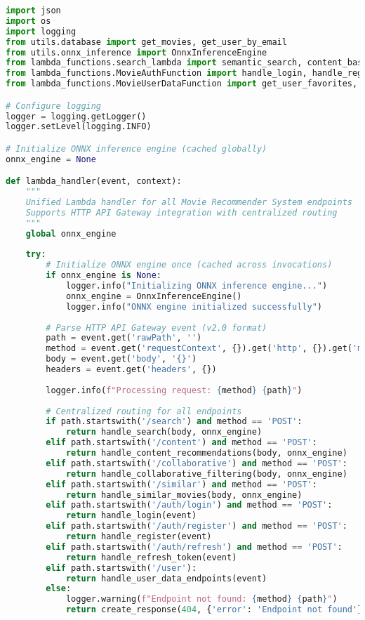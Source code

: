 \documentclass[11pt,a4paper]{article}
\begin{document}
\begin{lstlisting}[language=Python, caption=Lambda Handler - Router Centralizzato]
import json
import os
import logging
from utils.database import get_movies, get_user_by_email
from utils.onnx_inference import OnnxInferenceEngine
from lambda_functions.search_lambda import semantic_search, content_based_recommendations
from lambda_functions.MovieAuthFunction import handle_login, handle_register, handle_refresh_token
from lambda_functions.MovieUserDataFunction import get_user_favorites, add_to_favorites

# Configure logging
logger = logging.getLogger()
logger.setLevel(logging.INFO)

# Initialize ONNX inference engine (cached globally)
onnx_engine = None

def lambda_handler(event, context):
    """
    Unified Lambda handler for all Movie Recommender System endpoints
    Supports HTTP API Gateway integration with centralized routing
    """
    global onnx_engine
    
    try:
        # Initialize ONNX engine once (cached across invocations)
        if onnx_engine is None:
            logger.info("Initializing ONNX inference engine...")
            onnx_engine = OnnxInferenceEngine()
            logger.info("ONNX engine initialized successfully")
        
        # Parse HTTP API Gateway event (v2.0 format)
        path = event.get('rawPath', '')
        method = event.get('requestContext', {}).get('http', {}).get('method', '')
        body = event.get('body', '{}')
        headers = event.get('headers', {})
        
        logger.info(f"Processing request: {method} {path}")
        
        # Centralized routing for all endpoints
        if path.startswith('/search') and method == 'POST':
            return handle_search(body, onnx_engine)
        elif path.startswith('/content') and method == 'POST':
            return handle_content_recommendations(body, onnx_engine)
        elif path.startswith('/collaborative') and method == 'POST':
            return handle_collaborative_filtering(body, onnx_engine)
        elif path.startswith('/similar') and method == 'POST':
            return handle_similar_movies(body, onnx_engine)
        elif path.startswith('/auth/login') and method == 'POST':
            return handle_login(event)
        elif path.startswith('/auth/register') and method == 'POST':
            return handle_register(event)
        elif path.startswith('/auth/refresh') and method == 'POST':
            return handle_refresh_token(event)
        elif path.startswith('/user'):
            return handle_user_data_endpoints(event)
        else:
            logger.warning(f"Endpoint not found: {method} {path}")
            return create_response(404, {'error': 'Endpoint not found'})
            

\end{lstlisting}
\end{document}

